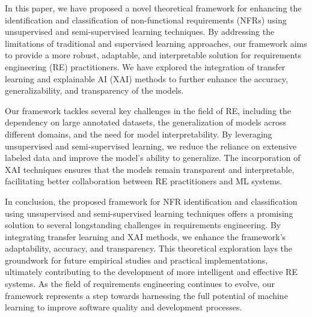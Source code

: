 \documentclass[sigconf,natbib=false]{acmart}
\begin{document}
In this paper, we have proposed a novel theoretical framework for enhancing the identification and classification of non-functional requirements (NFRs) using unsupervised and semi-supervised learning techniques. By addressing the limitations of traditional and supervised learning approaches, our framework aims to provide a more robust, adaptable, and interpretable solution for requirements engineering (RE) practitioners. We have explored the integration of transfer learning and explainable AI (XAI) methods to further enhance the accuracy, generalizability, and transparency of the models.

Our framework tackles several key challenges in the field of RE, including the dependency on large annotated datasets, the generalization of models across different domains, and the need for model interpretability. By leveraging unsupervised and semi-supervised learning, we reduce the reliance on extensive labeled data and improve the model's ability to generalize. The incorporation of XAI techniques ensures that the models remain transparent and interpretable, facilitating better collaboration between RE practitioners and ML systems.

In conclusion, the proposed framework for NFR identification and classification using unsupervised and semi-supervised learning techniques offers a promising solution to several longstanding challenges in requirements engineering. By integrating transfer learning and XAI methods, we enhance the framework's adaptability, accuracy, and transparency. This theoretical exploration lays the groundwork for future empirical studies and practical implementations, ultimately contributing to the development of more intelligent and effective RE systems. As the field of requirements engineering continues to evolve, our framework represents a step towards harnessing the full potential of machine learning to improve software quality and development processes.

\printbibliography

%
\end{document}
